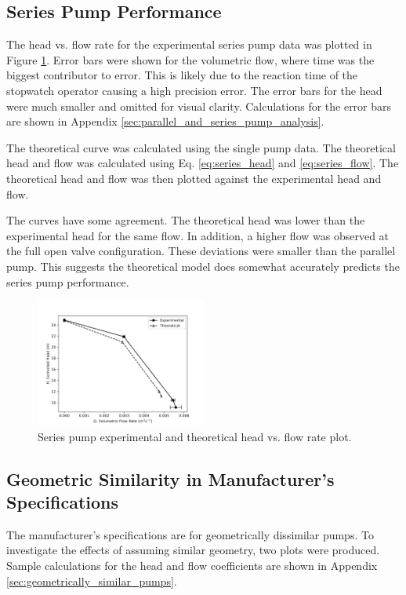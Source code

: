 \subsection{Series Pump Performance}
The head vs. flow rate for the experimental series pump data was plotted in Figure \ref{fig:series_pump_plot}. Error bars were shown for the volumetric flow, where time was the biggest contributor to error. This is likely due to the reaction time of the stopwatch operator causing a high precision error. The error bars for the head were much smaller and omitted for visual clarity. Calculations for the error bars are shown in Appendix \ref{sec:parallel_and_series_pump_analysis}.

The theoretical curve was calculated using the single pump data. The theoretical head and flow was calculated using Eq. \ref{eq:series_head} and \ref{eq:series_flow}. The theoretical head and flow was then plotted against the experimental head and flow.

The curves have some agreement. The theoretical head was lower than the experimental head for the same flow. In addition, a higher flow was observed at the full open valve configuration. These deviations were smaller than the parallel pump. This suggests the theoretical model does somewhat accurately predicts the series pump performance.

\begin{figure}[h]
    \centering
    \includegraphics[width=0.5\textwidth]{Sections/Figures/Series Pump Plot.png}
    \caption{Series pump experimental and theoretical head vs. flow rate plot.}
    \label{fig:series_pump_plot}
\end{figure}

\subsection{Geometric Similarity in Manufacturer's Specifications}
The manufacturer's specifications are for geometrically dissimilar pumps. To investigate the effects of assuming similar geometry, two plots were produced. Sample calculations for the head and flow coefficients are shown in Appendix \ref{sec:geometrically_similar_pumps}.

